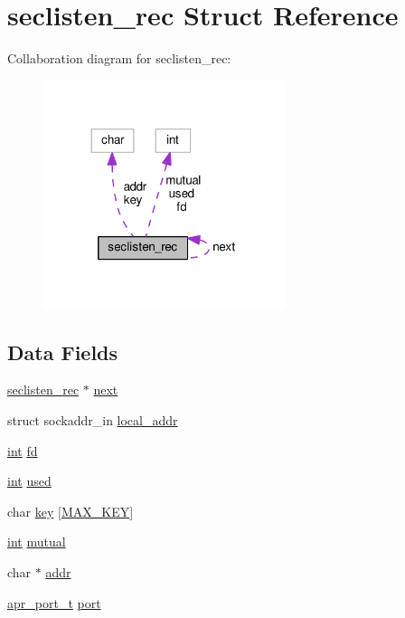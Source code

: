 \hypertarget{structseclisten__rec}{}\section{seclisten\+\_\+rec Struct Reference}
\label{structseclisten__rec}


Collaboration diagram for seclisten\+\_\+rec\+:
\nopagebreak
\begin{figure}[H]
\begin{center}
\leavevmode
\includegraphics[width=200pt]{structseclisten__rec__coll__graph}
\end{center}
\end{figure}
\subsection*{Data Fields}
\begin{DoxyCompactItemize}
\item 
\hyperlink{structseclisten__rec}{seclisten\+\_\+rec} $\ast$ \hyperlink{structseclisten__rec_a68a4427decde1a8200248d6810b15351}{next}
\item 
struct sockaddr\+\_\+in \hyperlink{structseclisten__rec_a3a901575255c6df174c85723a8317673}{local\+\_\+addr}
\item 
\hyperlink{pcre_8txt_a42dfa4ff673c82d8efe7144098fbc198}{int} \hyperlink{structseclisten__rec_ac41e9f425cf2ea41ae9f59a910d83c8c}{fd}
\item 
\hyperlink{pcre_8txt_a42dfa4ff673c82d8efe7144098fbc198}{int} \hyperlink{structseclisten__rec_aa0a7ecbaa4b26a5db632cf147199097d}{used}
\item 
char \hyperlink{structseclisten__rec_a65c9b11188aa20bd5efafc1a54afe3b5}{key} \mbox{[}\hyperlink{mod__nw__ssl_8c_a3cb816ed7690a32c5d6f67d7cb615ca4}{M\+A\+X\+\_\+\+K\+EY}\mbox{]}
\item 
\hyperlink{pcre_8txt_a42dfa4ff673c82d8efe7144098fbc198}{int} \hyperlink{structseclisten__rec_af29fd0e9a90100e28af3747038191f4a}{mutual}
\item 
char $\ast$ \hyperlink{structseclisten__rec_ab9c259cc9223b7c11159c6682bc4c177}{addr}
\item 
\hyperlink{group__apr__network__io_gaa670a71960f6eb4fe0d0de2a1e7aba03}{apr\+\_\+port\+\_\+t} \hyperlink{structseclisten__rec_ae1f3363fb6e7f7c5e5bc8eb036581abc}{port}
\end{DoxyCompactItemize}


